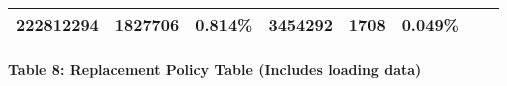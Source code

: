\documentclass[11pt]{article}
\begin{document}
\begin{longtable}[]{@{}llllllll@{}}
\begin{minipage}[t]{0.08\columnwidth}
222812294\strut
\end{minipage} & \begin{minipage}[t]{0.09\columnwidth}\raggedright\strut
1827706\strut
\end{minipage} & \begin{minipage}[t]{0.09\columnwidth}\raggedright\strut
0.814\%\strut
\end{minipage} & \begin{minipage}[t]{0.09\columnwidth}\raggedright\strut
3454292\strut
\end{minipage} & \begin{minipage}[t]{0.10\columnwidth}\raggedright\strut
1708\strut
\end{minipage} & \begin{minipage}[t]{0.10\columnwidth}\raggedright\strut
0.049\%\strut
\end{minipage}\tabularnewline
\bottomrule
\end{longtable}

\paragraph{Table 8: Replacement Policy Table (Includes loading
data)}\label{table-8-replacement-policy-table-includes-loading-data}
\end{document}

